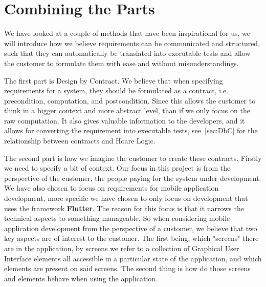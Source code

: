 \section{Combining the Parts}\label{sec:combiningtheparts}
We have looked at a couple of methods that have been inspirational for us, we will introduce how we believe requirements can be communicated and structured, such that they can automatically be translated into executable tests and allow the customer to formulate them with ease and without misunderstandings.

The first part is Design by Contract.
We believe that when specifying requirements for a system, they should be formulated as a contract, i.e. precondition, computation, and postcondition. 
Since this allows the customer to think in a bigger context and more abstract level, than if we only focus on the raw computation.
It also gives valuable information to the developers, and it allows for converting the requirement into executable tests, see~\autoref{sec:DbC} for the relationship between contracts and Hoare Logic.

The second part is how we imagine the customer to create these contracts.
Firstly we need to specify a bit of context.
Our focus in this project is from the perspective of the customer, the people paying for the system under development.
We have also chosen to focus on requirements for mobile application development, more specific we have chosen to only focus on development that uses the framework \textbf{Flutter}.
The reason for this focus is that it narrows the technical aspects to something manageable.
So when considering mobile application development from the perspective of a customer, we believe that two key aspects are of interest to the customer.
The first being, which "screens" there are in the application, by screens we refer to a collection of Graphical User Interface elements all accessible in a particular state of the application, and which elements are present on said screens.
The second thing is how do those screens and elements behave when using the application.

